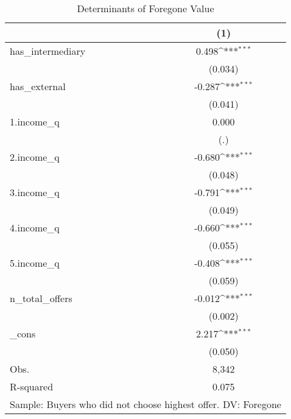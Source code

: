 \begin{table}[htbp]\centering
\def\sym#1{\ifmmode^{#1}\else\(^{#1}\)\fi}
\caption{Determinants of Foregone Value}
\begin{tabular}{l*{1}{c}}
\hline\hline
            &\multicolumn{1}{c}{(1)}         \\
\hline
has\_intermediary&       0.498\sym{***}\\
            &     (0.034)         \\
[1em]
has\_external&      -0.287\sym{***}\\
            &     (0.041)         \\
[1em]
1.income\_q  &       0.000         \\
            &         (.)         \\
[1em]
2.income\_q  &      -0.680\sym{***}\\
            &     (0.048)         \\
[1em]
3.income\_q  &      -0.791\sym{***}\\
            &     (0.049)         \\
[1em]
4.income\_q  &      -0.660\sym{***}\\
            &     (0.055)         \\
[1em]
5.income\_q  &      -0.408\sym{***}\\
            &     (0.059)         \\
[1em]
n\_total\_offers&      -0.012\sym{***}\\
            &     (0.002)         \\
[1em]
\_cons      &       2.217\sym{***}\\
            &     (0.050)         \\
\hline
Obs.        &       8,342         \\
R-squared   &       0.075         \\
\hline\hline
\multicolumn{2}{l}{\footnotesize Sample: Buyers who did not choose highest offer. DV: Foregone }\\
\end{tabular}
\end{table}
